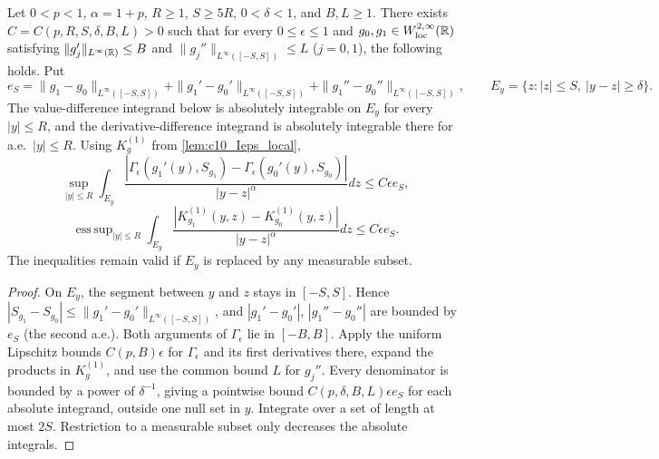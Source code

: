 \begin{lemma}
  \label{lem:c10_Ieps_compact_difference}
  Let $0<p<1$, $\alpha=1+p$, $R\ge1$, $S\ge5R$, $0<\delta<1$, and $B,L\ge1$.
  There exists $C=C(p,R,S,\delta,B,L)>0$ such that for every $0\le\epsilon\le1$ and
  $g_0,g_1\in W^{2,\infty}_{\mathrm{loc}}(\mathbb{R})$ satisfying
  $\|g_j'\|_{L^\infty(\mathbb{R})}\le B$ and $\|g_j''\|_{L^\infty([-S,S])}\le L$ ($j=0,1$), the following holds.
  Put
  \[
    e_S=\|g_1-g_0\|_{L^\infty([-S,S])}
       +\|g_1'-g_0'\|_{L^\infty([-S,S])}
       +\|g_1''-g_0''\|_{L^\infty([-S,S])},\qquad
    E_y=\{z:|z|\le S,\ |y-z|\ge\delta\}.
  \]
  The value-difference integrand below is absolutely integrable on $E_y$ for every $|y|\le R$,
  and the derivative-difference integrand is absolutely integrable there for a.e.\ $|y|\le R$.
  Using $K_g^{(1)}$ from \cref{lem:c10_Ieps_local},
  \[
    \sup_{|y|\le R}\int_{E_y}
       \frac{|\Gamma_\epsilon(g_1'(y),S_{g_1})-\Gamma_\epsilon(g_0'(y),S_{g_0})|}{|y-z|^\alpha}dz
       \le C\epsilon e_S,
  \]
  \[
    \mathop{\mathrm{ess\,sup}}_{|y|\le R}\int_{E_y}
       \frac{|K_{g_1}^{(1)}(y,z)-K_{g_0}^{(1)}(y,z)|}{|y-z|^\alpha}dz
       \le C\epsilon e_S.
  \]
  The inequalities remain valid if $E_y$ is replaced by any measurable subset.
\end{lemma}
\begin{proof}
  On $E_y$, the segment between $y$ and $z$ stays in $[-S,S]$.
  Hence $|S_{g_1}-S_{g_0}|\le\|g_1'-g_0'\|_{L^\infty([-S,S])}$, and
  $|g_1'-g_0'|$, $|g_1''-g_0''|$ are bounded by $e_S$ (the second a.e.).
  Both arguments of $\Gamma_\epsilon$ lie in $[-B,B]$. Apply the uniform Lipschitz bounds
  $C(p,B)\epsilon$ for $\Gamma_\epsilon$ and its first derivatives there, expand the products
  in $K_g^{(1)}$, and use the common bound $L$ for $g_j''$.
  Every denominator is bounded by a power of $\delta^{-1}$, giving a pointwise bound
  $C(p,\delta,B,L)\epsilon e_S$ for each absolute integrand, outside one null set in $y$.
  Integrate over a set of length at most $2S$. Restriction to a measurable subset only decreases
  the absolute integrals.
\end{proof}

